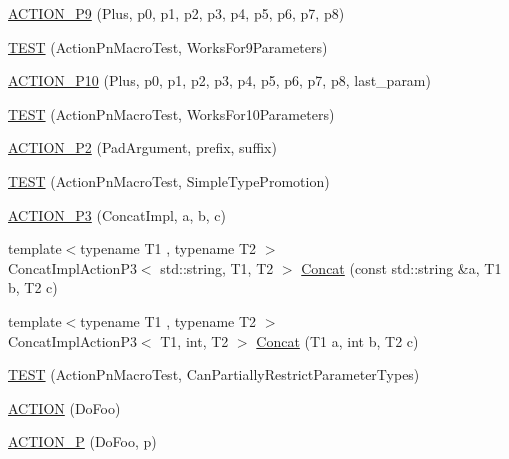 \begin{DoxyCompactItemize}
\item 
\hyperlink{namespacetesting_1_1gmock__generated__actions__test_ab023ad5e95ca2c2b8845963ce7222e00}{A\+C\+T\+I\+O\+N\+\_\+\+P9} (Plus, p0, p1, p2, p3, p4, p5, p6, p7, p8)
\item 
\hyperlink{namespacetesting_1_1gmock__generated__actions__test_a52d6dc447a4a71524adfeb7c8f7b6a68}{T\+E\+ST} (Action\+Pn\+Macro\+Test, Works\+For9\+Parameters)
\item 
\hyperlink{namespacetesting_1_1gmock__generated__actions__test_a3c6e7ef6aefc94efc9e815e92f0b3e47}{A\+C\+T\+I\+O\+N\+\_\+\+P10} (Plus, p0, p1, p2, p3, p4, p5, p6, p7, p8, last\+\_\+param)
\item 
\hyperlink{namespacetesting_1_1gmock__generated__actions__test_a564fd77344f58b26577452a380c93935}{T\+E\+ST} (Action\+Pn\+Macro\+Test, Works\+For10\+Parameters)
\item 
\hyperlink{namespacetesting_1_1gmock__generated__actions__test_ad58030fe83ad47cdb4ff027f8399adb4}{A\+C\+T\+I\+O\+N\+\_\+\+P2} (Pad\+Argument, prefix, suffix)
\item 
\hyperlink{namespacetesting_1_1gmock__generated__actions__test_ad42236ad6c6d01fad6dd947ca6163d59}{T\+E\+ST} (Action\+Pn\+Macro\+Test, Simple\+Type\+Promotion)
\item 
\hyperlink{namespacetesting_1_1gmock__generated__actions__test_ae46434959151b83249e52d4869e28cf0}{A\+C\+T\+I\+O\+N\+\_\+\+P3} (Concat\+Impl, a, b, c)
\item 
{\footnotesize template$<$typename T1 , typename T2 $>$ }\\Concat\+Impl\+Action\+P3$<$ std\+::string, T1, T2 $>$ \hyperlink{namespacetesting_1_1gmock__generated__actions__test_a28213583d5450876b564a3df58d1cf91}{Concat} (const std\+::string \&a, T1 b, T2 c)
\item 
{\footnotesize template$<$typename T1 , typename T2 $>$ }\\Concat\+Impl\+Action\+P3$<$ T1, int, T2 $>$ \hyperlink{namespacetesting_1_1gmock__generated__actions__test_a861e9fadbecf0c66e8226021c6c22013}{Concat} (T1 a, int b, T2 c)
\item 
\hyperlink{namespacetesting_1_1gmock__generated__actions__test_a7222610b197216e7976b3fa751f97daf}{T\+E\+ST} (Action\+Pn\+Macro\+Test, Can\+Partially\+Restrict\+Parameter\+Types)
\item 
\hyperlink{namespacetesting_1_1gmock__generated__actions__test_a183b3863b3c2319ac414fe694455f58c}{A\+C\+T\+I\+ON} (Do\+Foo)
\item 
\hyperlink{namespacetesting_1_1gmock__generated__actions__test_a8487a3396f4f705e134e44584634ef1c}{A\+C\+T\+I\+O\+N\+\_\+P} (Do\+Foo, p)

\end{DoxyCompactItemize}
